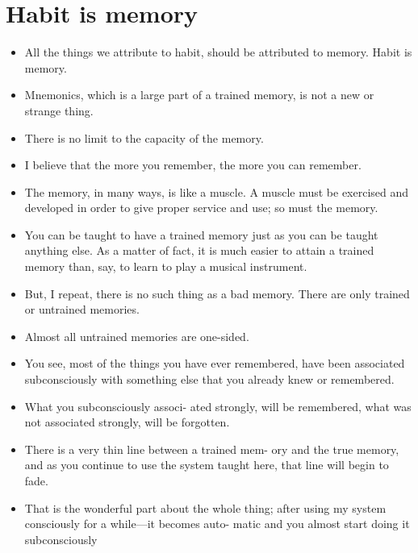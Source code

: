    \section*{Habit is memory}
        \begin{itemize}
            \item All the things we attribute to habit, should be
            attributed to memory. Habit is memory.
            \item Mnemonics, which is a large part of a trained memory, is
            not a new or strange thing.
            \item There is no limit to the capacity of the memory.
            \item I believe that the more you remember, the more you can
            remember.
            \item The memory, in many ways, is like a muscle. A
            muscle must be exercised and developed in order to give
            proper service and use; so must the memory.
            \item You can be taught to have a
            trained memory just as you can be taught anything else.
            As a matter of fact, it is much easier to attain a trained
            memory than, say, to learn to play a musical instrument.
            \item But, I repeat, there is no such thing as a bad memory.
            There are only trained or untrained memories.
            \item Almost all
            untrained memories are one-sided.
            \item You see, most of the things you have ever remembered,
            have been associated subconsciously with something else
            that you already knew or remembered.
            \item What you subconsciously associ-
            ated strongly, will be remembered, what was not associated
            strongly, will be forgotten.
            \item There is a very thin line between a trained mem-
            ory and the true memory, and as you continue to use the
            system taught here, that line will begin to fade.
            \item That is the wonderful part about the whole thing; after
            using my system consciously for a while—it becomes auto-
            matic and you almost start doing it subconsciously
        \end{itemize}

